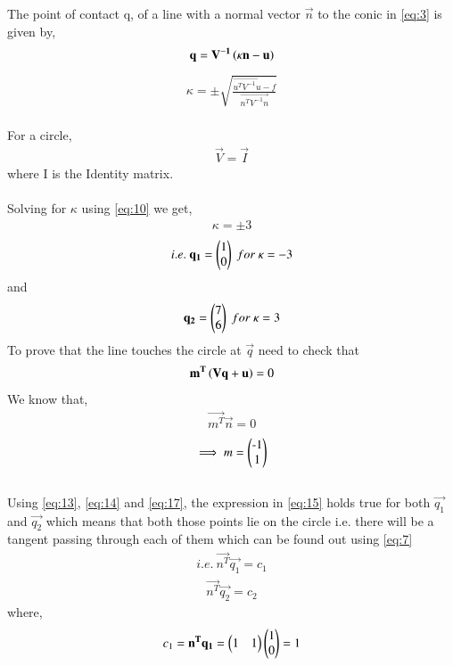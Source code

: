 \documentclass[journal,12pt,twocolumn]{IEEEtran}
\begin{document}
The point of contact q, of a line with a normal vector $\vec{n}$ to the conic in \eqref{eq:3} is given by,
\begin{align}
\mathbf{q} = \mathbf{V^{-1}}\left(\kappa\mathbf{n} - \mathbf{u}\right) \label{eq:9}
\end{align}
\begin{align}
\kappa = \pm \sqrt{\frac{\vec{u^TV^{-1}u}-f}{\vec{n^TV^{-1}n}}} \label{eq:10}
\end{align}\\
For a circle,
\begin{align}
\vec{V} = \vec{I} \label{eq:11}
\end{align}
where I is the Identity matrix.\\\\
Solving for $\kappa$ using \eqref{eq:10} we get,
\begin{align}
\kappa = \pm 3 \label{eq:12}
\end{align}
\begin{align}
i.e. \ \mathbf{q_1} = \begin{pmatrix}1 \\ 0\end{pmatrix} \ for \ \kappa = -3 \label{eq:13}
\end{align}
and
\begin{align}
\mathbf{q_2} = \begin{pmatrix}7 \\ 6\end{pmatrix} \ for \ \kappa = 3 \label{eq:14}
\end{align}
To prove that the line touches the circle at $\vec{q}$ need to check that
\begin{align}
\mathbf{m^T}\left(\mathbf{V}\mathbf{q}+\mathbf{u}\right) = 0 \label{eq:15}
\end{align}
We know that,
\begin{align}
\vec{m^T}\vec{n} = 0 \label{eq:16}
\end{align}
\begin{align}
\implies m = \myvec{$-$1 \\ 1} \label{eq:17} 
\end{align}\\
Using \eqref{eq:13}, \eqref{eq:14} and \eqref{eq:17}, the expression in \eqref{eq:15} holds true for both $\vec{q_1}$ and $\vec{q_2}$ which means that both those points lie on the circle i.e. there will be a tangent passing through each of them which can be found out using \eqref{eq:7}
\begin{align}
i.e. \ \vec{n^T}\vec{q_1} = c_1 \label{eq:18}
\end{align}
\begin{align}
\vec{n^T}\vec{q_2} = c_2 \label{eq:19}
\end{align}
where,
\begin{align}
c_1 = \mathbf{n^Tq_1} = \begin{pmatrix}1 & 1\end{pmatrix}\begin{pmatrix}1 \\ 0\end{pmatrix} = 1  \label{eq:20}
\end{align}
\end{document}
